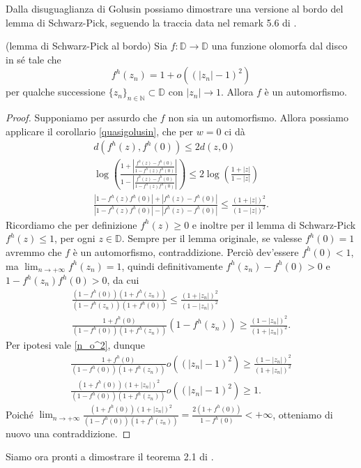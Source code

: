 Dalla disuguaglianza di Golusin possiamo dimostrare una versione al bordo del lemma di Schwarz-Pick, seguendo la traccia data nel remark 5.6 di \cite{BKR}.

\begin{thm} \label{boundary_schwarz_pick}
  (lemma di Schwarz-Pick al bordo) Sia $f:\mathbb{D} \longrightarrow \mathbb{D}$ una funzione olomorfa dal disco in sé tale che
  \begin{equation} \label{n_o^2}
    f^h(z_n)=1+o((|z_n|-1)^2)
  \end{equation}
  per qualche successione $\{z_n\}_{n \in \mathbb{N}} \subset \mathbb{D}$ con $|z_n| \longrightarrow 1$. Allora $f$ è un automorfismo.
\end{thm}

\begin{proof}
  Supponiamo per assurdo che $f$ non sia un automorfismo. Allora possiamo applicare il corollario \ref{quasigolusin}, che per $w=0$ ci dà
  \begin{align*}
    d(f^h(z), f^h(0)) \le 2d(z,0) \\
    \log{\left(\frac{1+\left|\frac{f^h(z)-f^h(0)}{1-f^h(z)f^h(0)}\right|}{1-\left|\frac{f^h(z)-f^h(0)}{1-f^h(z)f^h(0)}\right|}\right)} \le 2\log{\left(\frac{1+|z|}{1-|z|}\right)} \\
    \frac{|1-f^h(z)f^h(0)|+|f^h(z)-f^h(0)|}{|1-f^h(z)f^h(0)|-|f^h(z)-f^h(0)|} \le \frac{(1+|z|)^2}{(1-|z|)^2}.
  \end{align*}
  Ricordiamo che per definizione $f^h(z) \ge 0$ e inoltre per il lemma di Schwarz-Pick $f^h(z) \le 1$, per ogni $z \in \mathbb{D}$. Sempre per il lemma originale, se valesse $f^h(0)=1$ avremmo che $f$ è un automorfismo, contraddizione. Perciò dev'essere $f^h(0)<1$, ma $\displaystyle \lim_{n \longrightarrow +\infty} f^h(z_n)=1$, quindi definitivamente $f^h(z_n)-f^h(0)>0$ e $1-f^h(z_n)f^h(0)>0$, da cui
  \begin{align*}
    \frac{(1-f^h(0))(1+f^h(z_n))}{(1-f^h(z_n))(1+f^h(0))} \le \frac{(1+|z_n|)^2}{(1-|z_n|)^2} \\
    \frac{1+f^h(0)}{(1-f^h(0))(1+f^h(z_n))}(1-f^h(z_n)) \ge \frac{(1-|z_n|)^2}{(1+|z_n|)^2}.
  \end{align*}
  Per ipotesi vale \eqref{n_o^2}, dunque
  \begin{align*}
    \frac{1+f^h(0)}{(1-f^h(0))(1+f^h(z_n))}o((|z_n|-1)^2) \ge \frac{(1-|z_n|)^2}{(1+|z_n|)^2} \\
    \frac{(1+f^h(0))(1+|z_n|)^2}{(1-f^h(0))(1+f^h(z_n))}o((|z_n|-1)^2) \ge 1.
  \end{align*}
  Poiché $\displaystyle \lim_{n \longrightarrow +\infty} \frac{(1+f^h(0))(1+|z_n|)^2}{(1-f^h(0))(1+f^h(z_n))}=\frac{2(1+f^h(0))}{1-f^h(0)} < +\infty$, otteniamo di nuovo una contraddizione.
\end{proof}

Siamo ora pronti a dimostrare il teorema 2.1 di \cite{BK}.
